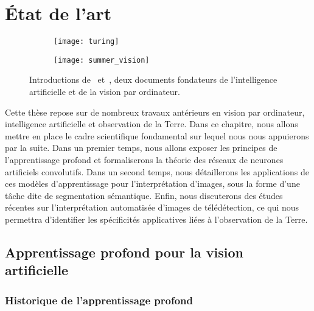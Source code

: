 \chapter{État de l'art}
\label{chap:etat}
\minitoc
\newpage

\begin{figure}[h]
  \begin{subfigure}{0.5\textwidth}
     \texttt{[image: turing]}
  \end{subfigure}
  \begin{subfigure}{0.5\textwidth}
     \texttt{[image: summer\_vision]}
  \end{subfigure}
  \caption[Introductions de \emph{Computing Machinery and Intelligence} (Turing, 1950) et \emph{Summer Vision Project} (Papert, 1966).]{Introductions de~\citet{turing_computing_1950} et~\citet{papert_summer_1966}, deux documents fondateurs de l'intelligence artificielle et de la vision par ordinateur.}
  \label{fig:introductions}
\end{figure}

Cette thèse repose sur de nombreux travaux antérieurs en vision par ordinateur, intelligence artificielle et observation de la Terre. Dans ce chapitre, nous allons mettre en place le cadre scientifique fondamental sur lequel nous nous appuierons par la suite. Dans un premier temps, nous allons exposer les principes de l'apprentissage profond et formaliserons la théorie des réseaux de neurones artificiels convolutifs. Dans un second temps, nous détaillerons les applications de ces modèles d'apprentissage pour l'interprétation d'images, sous la forme d'une tâche dite de segmentation sémantique. Enfin, nous discuterons des études récentes sur l'interprétation automatisée d'images de télédétection, ce qui nous permettra d'identifier les spécificités applicatives liées à l'observation de la Terre.

\section{Apprentissage profond pour la vision artificielle}

\subsection{Historique de l'apprentissage profond}

